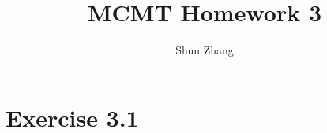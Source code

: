\documentclass[10pt]{article}
\title{MCMT Homework 3}
\author{Shun Zhang}
\date{}
\begin{document}
\maketitle

\section*{Exercise 3.1}
\end{document}

